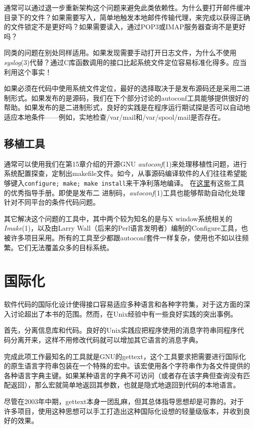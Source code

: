 \documentclass[12pt,oneside]{book}
\begin{document}
通常可以通过退一步重新架构这个问题来避免此类依赖性。为什么要打开邮件缓冲目录下的文件？如果需要写入，简单地触发本地邮件传输代理，来完成以获得正确的文件锁定不是更好吗？如果需要读入，通过POP3或IMAP服务器查询不是更好吗？

同类的问题在别处同样适用。如果发现需要手动打开日志文件，为什么不使用\textit{syslog}(3)代替？通过C库函数调用的接口比起系统文件定位容易标准化得多。应当利用这个事实！

如果必须在代码中使用系统文件定位，最好的选择取决于是发布源码还是采用二进制形式。如果发布的是源码，我们在下个部分讨论的autoconf工具能够提供很好的帮助。如果发布的是二进制形式，良好的实践是在程序运行期试探是否可以自动地适应本地条件——例如，实地检查/var/mail和/var/spool/mail是否存在。

\subsection{移植工具}
通常可以使用我们在第15章介绍的开源GNU \textit{autoconf}(1)来处理移植性问题，进行系统配置探查，定制出makefile文件。如今，从事源码编译软件的人们往往希望能够键入\verb+configure; make; make install+来干净利落地编译。  在\href{http://seul.org/docs/autotut/}{这里}有这些工具的优秀指导手册。即使是发布二
进制码，\textit{autoconf}(1)工具也能够帮助自动化处理针对不同平台的条件代码问题。

其它解决这个问题的工具中，其中两个较为知名的是与X window系统相关的\textit{Imake}(1)，以及由Larry Wall（后来的Perl语言发明者）编制的Configure工具，也被许多项目采用。所有的工具至少都跟autoconf套件一样复杂，使用也不如以往频繁。它们无法覆盖众多的目标系统。

\section{国际化}
软件代码的国际化设计使得接口容易适应多种语言和各种字符集，对于这方面的深入讨论超出了本书的范围。然而，在Unix经验中有一些良好实践的突出事例。

首先，分离信息库和代码。良好的Unix实践应把程序使用的消息字符串同程序代码分离开来，这样不用修改代码就可以增加其它语言的消息字典。

完成此项工作最知名的工具就是GNU的gettext，这个工具要求把需要进行国际化的原生语言字符串包装在一个特殊的宏中。该宏使用各个字符串作为各文件提供的各种语言字典主键。如果某种语言的字典不可访问（或者存在该字典但查询没有匹配返回），那么宏就简单地返回其参数，也就是隐式地退回到代码的本地语言。

尽管在2003年中期，gettext本身一团乱麻，但其总体指导思想却是可靠的。对于许多项目，使用这种思想可以手工打造出这种国际化设想的轻量级版本，并收到良好的效果。
\end{document}
